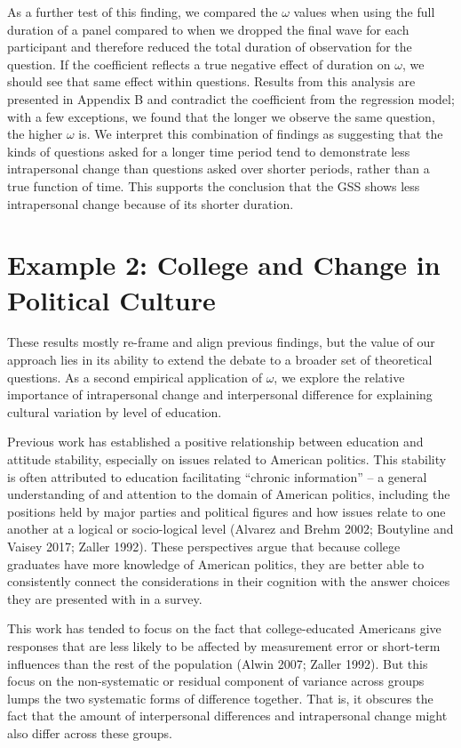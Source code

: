 \documentclass[
  11pt,
]{article}
\begin{document}
As a further test of this finding, we compared the \(\omega\) values
when using the full duration of a panel compared to when we dropped the
final wave for each participant and therefore reduced the total duration
of observation for the question. If the coefficient reflects a true
negative effect of duration on \(\omega\), we should see that same
effect within questions. Results from this analysis are presented in
Appendix B and contradict the coefficient from the regression model;
with a few exceptions, we found that the longer we observe the same
question, the higher \(\omega\) is. We interpret this combination of
findings as suggesting that the kinds of questions asked for a longer
time period tend to demonstrate less intrapersonal change than questions
asked over shorter periods, rather than a true function of time. This
supports the conclusion that the GSS shows less intrapersonal change
because of its shorter duration.

\section{Example 2: College and Change in Political
Culture}\label{example-2-college-and-change-in-political-culture}

These results mostly re-frame and align previous findings, but the value
of our approach lies in its ability to extend the debate to a broader
set of theoretical questions. As a second empirical application of
\(\omega\), we explore the relative importance of intrapersonal change
and interpersonal difference for explaining cultural variation by level
of education.

Previous work has established a positive relationship between education
and attitude stability, especially on issues related to American
politics. This stability is often attributed to education facilitating
``chronic information'' -- a general understanding of and attention to
the domain of American politics, including the positions held by major
parties and political figures and how issues relate to one another at a
logical or socio-logical level (Alvarez and Brehm 2002; Boutyline and
Vaisey 2017; Zaller 1992). These perspectives argue that because college
graduates have more knowledge of American politics, they are better able
to consistently connect the considerations in their cognition with the
answer choices they are presented with in a survey.

This work has tended to focus on the fact that college-educated
Americans give responses that are less likely to be affected by
measurement error or short-term influences than the rest of the
population (Alwin 2007; Zaller 1992). But this focus on the
non-systematic or residual component of variance across groups lumps the
two systematic forms of difference together. That is, it obscures the
fact that the amount of interpersonal differences and intrapersonal
change might also differ across these groups.
\end{document}
